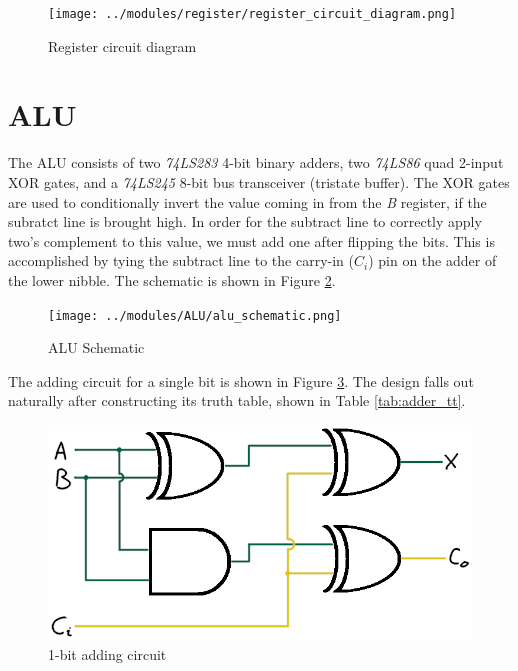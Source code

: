 \documentclass[12pt]{article}
\begin{document}
\begin{FlushLeft}
\begin{figure}[h]
  \begin{center}
    \texttt{[image: ../modules/register/register\_circuit\_diagram.png]}
    \caption{Register circuit diagram}
    \label{fig:register_circuit_diagram}
  \end{center}
\end{figure}



\section{ALU}
The ALU consists of two \textit{74LS283} 4-bit binary adders, two \textit{74LS86} quad 2-input XOR gates, and a \textit{74LS245} 8-bit bus transceiver (tristate buffer). The XOR gates are used to conditionally invert the value coming in from the \textit{B} register, if the subratct line is brought high. In order for the subtract line to correctly apply two's complement to this value, we must add one after flipping the bits. This is accomplished by tying the subtract line to the carry-in ($C_i$) pin on the adder of the lower nibble. The schematic is shown in Figure \ref{fig:alu_schematic}. \\

\begin{figure}[h]
  \begin{center}
    \texttt{[image: ../modules/ALU/alu\_schematic.png]}
    \caption{ALU Schematic}
    \label{fig:alu_schematic}
  \end{center}
\end{figure}

The adding circuit for a single bit is shown in Figure \ref{fig:1_bit_adder}. The design falls out naturally after constructing its truth table, shown in Table \ref{tab:adder_tt}. \\

\begin{figure}[h]
  \begin{center}
    \includegraphics[width=0.8\linewidth]{../modules/ALU/1_bit_adder.png}
    \caption{1-bit adding circuit}
    \label{fig:1_bit_adder}
  \end{center}
\end{figure}


\end{FlushLeft}
\end{document}
